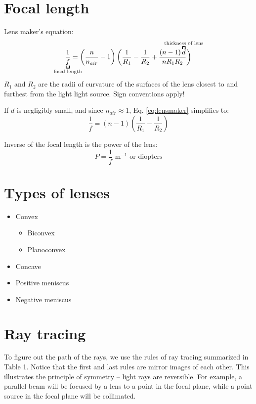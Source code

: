 \documentclass[a4paper]{report}
\begin{document}
\section{Focal length}
Lens maker's equation:
\begin{equation}
\label{eq:lensmaker}
	\frac{1}{\underbracket{f}_{\mathclap{\text{focal length}}}}=\left(\frac{n}{n_{air}}-1\right)
	\bigg(\frac{1}{R_1} -
	\frac{1}{R_2}+\frac{(n-1)\overbracket{d}^{\mathclap{\text{thickness of lens}}}}{nR_1R_2}\bigg)
\end{equation}
$R_1$ and $R_2$ are the radii of curvature of the surfaces of the lens closest to and furthest from the light light source. Sign conventions apply! 

If $d$ is negligibly small, and since $n_{air} \approx 1$, Eq. \ref{eq:lensmaker} simplifies to:
\begin{equation}
	\frac{1}{f} = (n-1)\left(\frac{1}{R_1} - \frac{1}{R_2}\right)
\end{equation}

Inverse of the focal length is the power of the lens:
\begin{equation}
	P = \frac{1}{f} \text{ m$^{-1}$ or diopters}
\end{equation}

\section{Types of lenses}
\begin{itemize}
	\item Convex
	\begin{itemize}
		\item Biconvex
		\item Planoconvex
	\end{itemize}
	\item Concave
	\item Positive meniscus
	\item Negative meniscus
\end{itemize}

\section{Ray tracing}
To figure out the path of the rays, we use the rules of ray tracing summarized in Table 1. Notice that the first and last rules are mirror images of each other. This illustrates the principle of symmetry -- light rays are reversible. For example, a parallel beam will be focused by a lens to a point in the focal plane, while a point source in the focal plane will be collimated.
\end{document}
